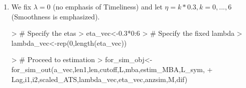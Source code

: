 \documentclass[a4paper]{book}
\begin{document}
\begin{enumerate}
\item We fix $\lambda=0$ (no emphasis of Timeliness) and let $\eta=k*0.3, k=0,...,6$ (Smoothness is emphasized).
\begin{Schunk}
\begin{Sinput}
> # Specify the etas
> eta_vec<-0.3*0:6
> # Specify the fixed lambda
> lambda_vec<-rep(0,length(eta_vec))
\end{Sinput}
\end{Schunk}
\begin{Schunk}
\begin{Sinput}
> # Proceed to estimation
> for_sim_obj<-for_sim_out(a_vec,len1,len,cutoff,L,mba,estim_MBA,L_sym,
+              Lag,i1,i2,scaled_ATS,lambda_vec,eta_vec,anzsim,M,dif)
\end{Sinput}
\end{Schunk}


\end{enumerate}
\end{document}

